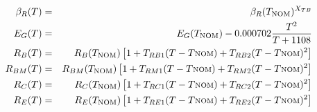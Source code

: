 \begin{eqnarray}
\beta_R(T)&=&\beta_R(T_{\mbox{\scriptsize NOM}})^{X_{TB}}\\
E_G(T) & = & E_G(T_{\mbox{\scriptsize NOM}}) - 0.000702{{T^2} \over {T+1108}}\\
R_B(T) & = & R_B(T_{\mbox{\scriptsize NOM}})\left[ 1 + T_{RB1} (T -  T{\mbox{\scriptsize NOM}})
         + T_{RB2} (T -  T{\mbox{\scriptsize NOM}})^2\right]\\
R_{BM}(T) & = & R_{BM}(T_{\mbox{\scriptsize NOM}})\left[ 1 + T_{RM1} (T -  T{\mbox{\scriptsize NOM}})
         + T_{RM2} (T -  T{\mbox{\scriptsize NOM}})^2\right]\\
R_C(T) & = & R_C(T_{\mbox{\scriptsize NOM}})\left[ 1 + T_{RC1} (T -  T{\mbox{\scriptsize NOM}})
         + T_{RC2} (T -  T{\mbox{\scriptsize NOM}})^2\right]\\
R_E(T) & = & R_E(T_{\mbox{\scriptsize NOM}})\left[ 1 + T_{RE1} (T -  T{\mbox{\scriptsize NOM}})
         + T_{RE2} (T -  T{\mbox{\scriptsize NOM}})^2\right]
\end{eqnarray}\\[0.1in]

